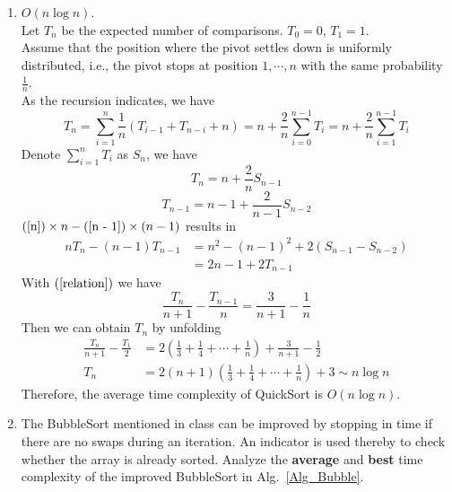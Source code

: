 \documentclass[12pt,a4paper]{article}
\makeatletter
\newtheorem*{solution}{Solution}
\theoremstyle{definition}
\renewenvironment{solution}[1][Solution] {\par\pushQED{\qed}\normalfont\topsep6\p@\@plus6\p@\relax\trivlist\item[\hskip\labelsep\bfseries#1\@addpunct{.}]\ignorespaces}{\popQED\endtrivlist\@endpefalse} \makeatother
\makeatother
\begin{document}
\begin{enumerate}
    \begin{solution}
        \hfill \break
        $O(n \log n)$. \\
        Let $T_n$ be the expected number of comparisons. $T_0 = 0$, $T_1 = 1$. \\
        Assume that the position where the pivot settles down is uniformly distributed, i.e., the pivot stops at position $1,\cdots,n$ with the same probability $\frac{1}{n}$. \\
        As the recursion indicates, we have
        \[
        	T_n = \sum_{i = 1}^{n} \frac{1}{n}(T_{i - 1} + T_{n - i} + n)
        	= n + \frac{2}{n} \sum_{i = 0}^{n - 1} T_i
        	= n + \frac{2}{n} \sum_{i = 1}^{n - 1} T_i
        \]
        Denote $\sum_{i = 1}^{n} T_i$ as $S_n$, we have
        \begin{equation} \label{n}
        	T_n = n + \frac{2}{n} S_{n - 1}
        \end{equation}
        \begin{equation} \label{n - 1}
	        T_{n - 1} = n - 1 + \frac{2}{n - 1} S_{n - 2}
        \end{equation}
        $(\ref{n}) \times n - (\ref{n - 1}) \times (n - 1)$ results in
        \begin{align} 
	        nT_n - (n - 1)T_{n - 1} & = n^2 - (n - 1)^2 + 2(S_{n - 1} - S_{n - 2}) \\ \label{relation}
	        & = 2n - 1 + 2T_{n - 1}
        \end{align}
        With $(\ref{relation})$ we have
        \begin{equation}
        	\frac{T_n}{n + 1} - \frac{T_{n - 1}}{n} = \frac{3}{n + 1} - \frac{1}{n}
        \end{equation}
        Then we can obtain $T_n$ by unfolding
        \begin{align}
	        \frac{T_n}{n + 1} - \frac{T_1}{2} & = 2(\frac{1}{3} + \frac{1}{4} + \cdots + \frac{1}{n}) + \frac{3}{n + 1} - \frac{1}{2} \\
	        T_n & = 2(n + 1)(\frac{1}{3} + \frac{1}{4} + \cdots + \frac{1}{n}) + 3 \sim n \log n
        \end{align}
        Therefore, the average time complexity of QuickSort is $O(n \log n)$. 
        
        
        	
        
    \end{solution}

    \item
    The BubbleSort mentioned in class can be improved by stopping in time if there are no swaps during an iteration. An indicator is used thereby to check whether the array is already sorted. Analyze the \textbf{average} and \textbf{best} time complexity of the improved BubbleSort in Alg.~\ref{Alg_Bubble}.


\end{enumerate}
\end{document}

